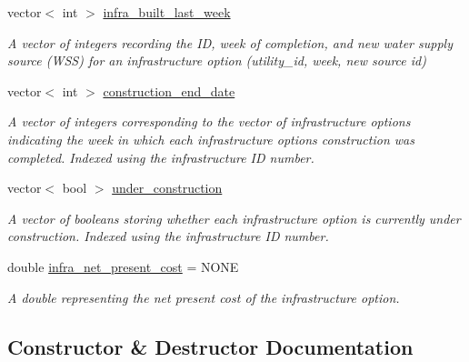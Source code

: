 \begin{DoxyCompactItemize}
vector$<$ int $>$ \mbox{\hyperlink{classInfrastructureManager_a5203fc0ae8e33885012415c1d0e27399}{infra\+\_\+built\+\_\+last\+\_\+week}}
\begin{DoxyCompactList}\small\item\em A vector of integers recording the ID, week of completion, and new water supply source (W\+SS) for an infrastructure option (utility\+\_\+id, week, new source id) \end{DoxyCompactList}\item 
vector$<$ int $>$ \mbox{\hyperlink{classInfrastructureManager_abe5accdeeb4343266335d208d41704ae}{construction\+\_\+end\+\_\+date}}
\begin{DoxyCompactList}\small\item\em A vector of integers corresponding to the vector of infrastructure options indicating the week in which each infrastructure option\textquotesingle{}s construction was completed. Indexed using the infrastructure ID number. \end{DoxyCompactList}\item 
vector$<$ bool $>$ \mbox{\hyperlink{classInfrastructureManager_a634ca1b01e1b7fa7c8b5468c9a842a51}{under\+\_\+construction}}
\begin{DoxyCompactList}\small\item\em A vector of booleans storing whether each infrastructure option is currently under construction. Indexed using the infrastructure ID number. \end{DoxyCompactList}\item 
double \mbox{\hyperlink{classInfrastructureManager_a959efbe51589414916d96b99bf5559cc}{infra\+\_\+net\+\_\+present\+\_\+cost}} = N\+O\+NE
\begin{DoxyCompactList}\small\item\em A double representing the net present cost of the infrastructure option. \end{DoxyCompactList}\end{DoxyCompactItemize}


\subsection{Constructor \& Destructor Documentation}
\mbox{\label{classInfrastructureManager_a2720f467b660e0f63f265e7957ca0139}} 

